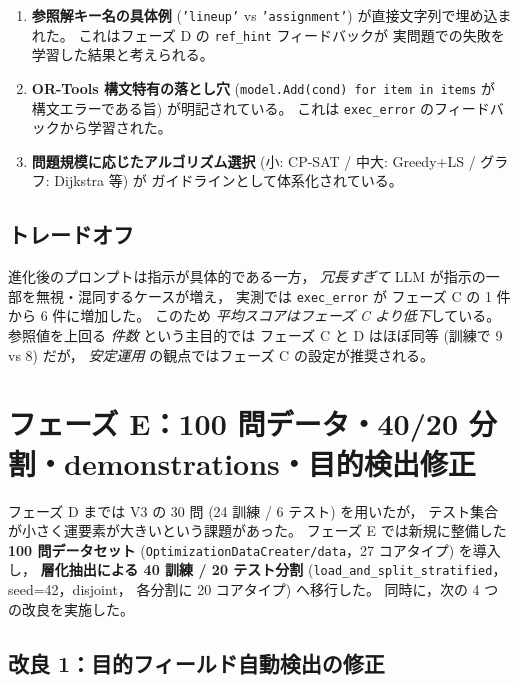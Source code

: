 \documentclass[uplatex,dvipdfmx,a4paper,11pt]{jsarticle}
\begin{document}
\begin{enumerate}
  \item \textbf{参照解キー名の具体例} (\texttt{'lineup'} vs
    \texttt{'assignment'}) が直接文字列で埋め込まれた。
    これはフェーズ D の \texttt{ref\_hint} フィードバックが
    実問題での失敗を学習した結果と考えられる。
  \item \textbf{OR-Tools 構文特有の落とし穴}
    (\texttt{model.Add(cond) for item in items} が
    構文エラーである旨) が明記されている。
    これは \texttt{exec\_error} のフィードバックから学習された。
  \item \textbf{問題規模に応じたアルゴリズム選択}
    (小: CP-SAT / 中大: Greedy+LS / グラフ: Dijkstra 等) が
    ガイドラインとして体系化されている。
\end{enumerate}

\subsection{トレードオフ}

進化後のプロンプトは指示が具体的である一方，
\emph{冗長すぎて} LLM が指示の一部を無視・混同するケースが増え，
実測では \texttt{exec\_error} が
フェーズ C の 1 件から 6 件に増加した。
このため \emph{平均スコアはフェーズ C より低下}している。
参照値を上回る \emph{件数} という主目的では
フェーズ C と D はほぼ同等 (訓練で 9 vs 8) だが，
\emph{安定運用} の観点ではフェーズ C の設定が推奨される。

\section{フェーズ E：100 問データ・40/20 分割・demonstrations・目的検出修正}\label{sec:phaseE}

フェーズ D までは V3 の 30 問 (24 訓練 / 6 テスト) を用いたが，
テスト集合が小さく運要素が大きいという課題があった。
フェーズ E では新規に整備した \textbf{100 問データセット}
(\texttt{OptimizationDataCreater/data}，27 コアタイプ) を導入し，
\textbf{層化抽出による 40 訓練 / 20 テスト分割}
(\texttt{load\_and\_split\_stratified}，seed=42，disjoint，
各分割に 20 コアタイプ) へ移行した。
同時に，次の 4 つの改良を実施した。

\subsection{改良 1：目的フィールド自動検出の修正}
\end{document}
